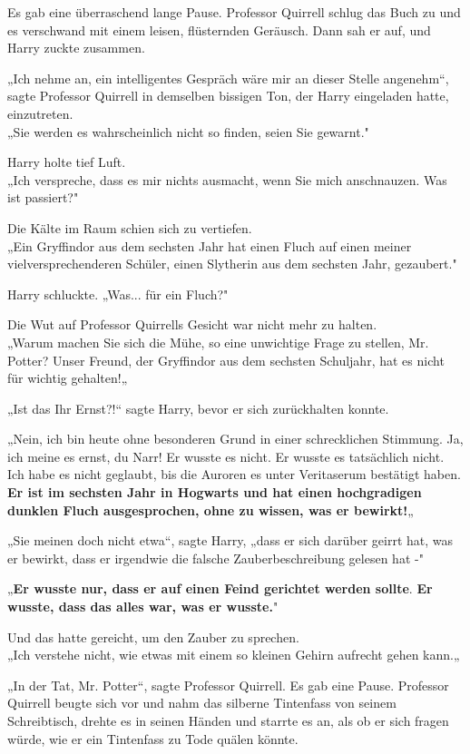 {Es gab eine überraschend lange Pause. Professor Quirrell schlug das Buch zu und es verschwand mit einem leisen, flüsternden Geräusch. Dann sah er auf, und Harry zuckte zusammen.

„Ich nehme an, ein intelligentes Gespräch wäre mir an dieser Stelle angenehm“, sagte Professor Quirrell in demselben bissigen Ton, der Harry eingeladen hatte, einzutreten.\\ „Sie werden es wahrscheinlich nicht so finden, seien Sie gewarnt."

Harry holte tief Luft.\\ „Ich verspreche, dass es mir nichts ausmacht, wenn Sie mich anschnauzen. Was ist passiert?"

Die Kälte im Raum schien sich zu vertiefen.\\ „Ein Gryffindor aus dem sechsten Jahr hat einen Fluch auf einen meiner vielversprechenderen Schüler, einen Slytherin aus dem sechsten Jahr, gezaubert."

Harry schluckte. „Was... für ein Fluch?"

Die Wut auf Professor Quirrells Gesicht war nicht mehr zu halten.\\ „Warum machen Sie sich die Mühe, so eine unwichtige Frage zu stellen, Mr. Potter? Unser Freund, der Gryffindor aus dem sechsten Schuljahr, hat es nicht für wichtig gehalten!„

„Ist das Ihr Ernst?!“ sagte Harry, bevor er sich zurückhalten konnte.

„Nein, ich bin heute ohne besonderen Grund in einer schrecklichen Stimmung. Ja, ich meine es ernst, du Narr! Er wusste es nicht. Er wusste es tatsächlich nicht. Ich habe es nicht geglaubt, bis die Auroren es unter Veritaserum bestätigt haben.\\ \textbf{Er ist im sechsten Jahr in Hogwarts und hat einen hochgradigen dunklen Fluch ausgesprochen, ohne zu wissen, was er bewirkt!}„

„Sie meinen doch nicht etwa“, sagte Harry, „dass er sich darüber geirrt hat, was er bewirkt, dass er irgendwie die falsche Zauberbeschreibung gelesen hat -"

„\textbf{Er wusste nur, dass er auf einen Feind gerichtet werden sollte}. \textbf{Er wusste, dass das alles war, was er wusste.}"

Und das hatte gereicht, um den Zauber zu sprechen.\\ „Ich verstehe nicht, wie etwas mit einem so kleinen Gehirn aufrecht gehen kann.„

„In der Tat, Mr. Potter“, sagte Professor Quirrell. Es gab eine Pause. Professor Quirrell beugte sich vor und nahm das silberne Tintenfass von seinem Schreibtisch, drehte es in seinen Händen und starrte es an, als ob er sich fragen würde, wie er ein Tintenfass zu Tode quälen könnte.

}
